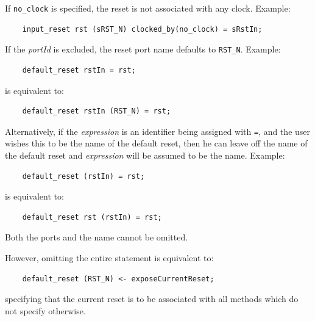 \documentclass[twoside,letterpaper]{article}
\newcommand{\te}[1]{\texttt{#1}}
\newcommand{\nterm}[1]{\emph{#1}}
\begin{document}
If \te{no\_clock} is specified, the
reset is not associated with any clock.  Example:
\begin{verbatim}
    input_reset rst (sRST_N) clocked_by(no_clock) = sRstIn;
\end{verbatim}


If the \nterm{portId} is excluded, the reset port name defaults to
\te{RST\_N}.  Example:
\begin{verbatim}
    default_reset rstIn = rst;
\end{verbatim}
is equivalent to:
\begin{verbatim}
    default_reset rstIn (RST_N) = rst;
\end{verbatim}




Alternatively, if the \nterm{expression} is an identifier being
assigned with \te{=}, and the user wishes this to be the name of the
default reset, then he can leave off the name of the default reset and
\nterm{expression} will be assumed to be the name.  Example:
\begin{verbatim}
    default_reset (rstIn) = rst;
\end{verbatim}
is equivalent to:
\begin{verbatim}
    default_reset rst (rstIn) = rst;
\end{verbatim}

Both the ports and the name cannot be omitted.  

However, omitting the
entire  statement is equivalent to:
\begin{verbatim}
    default_reset (RST_N) <- exposeCurrentReset;
\end{verbatim}
specifying that the current reset is to be associated with all methods
which do not specify otherwise.



\end{document}
